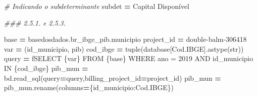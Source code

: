 \documentclass[
  12,
  dvipsnames]{article}
\newenvironment{Shaded}{\begin{snugshade}}{\end{snugshade}}
\newcommand{\BuiltInTok}[1]{#1}
\newcommand{\CommentTok}[1]{\textcolor[rgb]{0.56,0.35,0.01}{\textit{#1}}}
\newcommand{\NormalTok}[1]{#1}
\newcommand{\OperatorTok}[1]{\textcolor[rgb]{0.81,0.36,0.00}{\textbf{#1}}}
\newcommand{\SpecialCharTok}[1]{\textcolor[rgb]{0.00,0.00,0.00}{#1}}
\newcommand{\SpecialStringTok}[1]{\textcolor[rgb]{0.31,0.60,0.02}{#1}}
\newcommand{\StringTok}[1]{\textcolor[rgb]{0.31,0.60,0.02}{#1}}
\begin{document}
\begin{Shaded}
\begin{Highlighting}[]
\CommentTok{\# Indicando o subdeterminante }
\NormalTok{subdet }\OperatorTok{=} \StringTok{\textquotesingle{}Capital Disponível\textquotesingle{}}

\CommentTok{\#\#\# 2.5.1. e 2.5.3.}

\NormalTok{base }\OperatorTok{=} \StringTok{\textquotesingle{}\textasciigrave{}basedosdados.br\_ibge\_pib.municipio\textasciigrave{}\textquotesingle{}}
\NormalTok{project\_id }\OperatorTok{=} \StringTok{\textquotesingle{}double{-}balm{-}306418\textquotesingle{}}
\NormalTok{var }\OperatorTok{=}\NormalTok{ (}\StringTok{\textquotesingle{}id\_municipio, pib\textquotesingle{}}\NormalTok{)}
\NormalTok{cod\_ibge }\OperatorTok{=} \BuiltInTok{tuple}\NormalTok{(database[}\StringTok{\textquotesingle{}Cod.IBGE\textquotesingle{}}\NormalTok{].astype(}\BuiltInTok{str}\NormalTok{))}
\NormalTok{query }\OperatorTok{=} \SpecialStringTok{f\textquotesingle{}SELECT }\SpecialCharTok{\{}\NormalTok{var}\SpecialCharTok{\}}\SpecialStringTok{ FROM }\SpecialCharTok{\{}\NormalTok{base}\SpecialCharTok{\}}\SpecialStringTok{ WHERE ano = 2019 AND id\_municipio IN }\SpecialCharTok{\{}\NormalTok{cod\_ibge}\SpecialCharTok{\}}\SpecialStringTok{\textquotesingle{}}
\NormalTok{pib\_mun }\OperatorTok{=}\NormalTok{ bd.read\_sql(query}\OperatorTok{=}\NormalTok{query,billing\_project\_id}\OperatorTok{=}\NormalTok{project\_id)}
\NormalTok{pib\_mun }\OperatorTok{=}\NormalTok{ pib\_mun.rename(columns}\OperatorTok{=}\NormalTok{\{}\StringTok{\textquotesingle{}id\_municipio\textquotesingle{}}\NormalTok{:}\StringTok{\textquotesingle{}Cod.IBGE\textquotesingle{}}\NormalTok{\})}


\end{Highlighting}
\end{Shaded}
\end{document}
